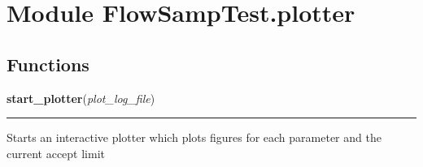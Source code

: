 %
%
%


\section{Module FlowSampTest.plotter}

    \label{FlowSampTest:plotter}


  \subsection{Functions}

    \label{FlowSampTest:plotter:start_plotter}

    \vspace{0.5ex}

\hspace{.8\funcindent}\begin{boxedminipage}{\funcwidth}

    \raggedright \textbf{start\_plotter}(\textit{plot\_log\_file})

    \vspace{-1.5ex}

    \rule{\textwidth}{0.5\fboxrule}
\setlength{\parskip}{2ex}
    Starts an interactive plotter which plots figures for each parameter 
    and the current accept limit

\setlength{\parskip}{1ex}
    \end{boxedminipage}



